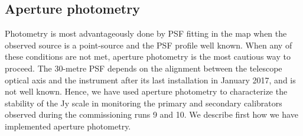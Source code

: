 %
%
%
%

\subsection{Aperture photometry}
\label{S:ApPh}

Photometry is most advantageously done by PSF fitting in the map when the observed source is a point-source and the PSF profile 
well known. When any of these conditions are not met, aperture photometry is the most cautious way to proceed.
The 30-metre PSF depends on the alignment between the telescope optical axis and the instrument 
after its last installation in January 2017, and is not well known. Hence, we have used aperture photometry to
characterize the stability of the Jy scale in monitoring the
primary and secondary calibrators observed during the commissioning runs 9 and 10.
We describe first how we have implemented aperture photometry.

